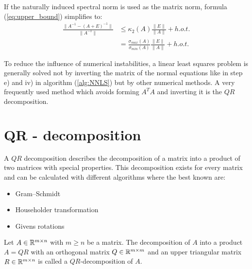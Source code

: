 \begin{remark}
	If the naturally induced spectral norm is used as the matrix norm, formula (\ref{eq:upper_bound}) simplifies to:
	\begin{align*}
		\frac{\lVert A^{-1} - (A + E)^{-1} \rVert}{\lVert A^{-1}\rVert} & \leq \kappa_2(A) \frac{\lVert E \rVert}{\lVert A \rVert} + h.o.t. \\
		& = \frac{\sigma_{max}(A)}{\sigma_{min}(A)} \frac{\lVert E \rVert}{\lVert A \rVert} + h.o.t.
	\end{align*}
\end{remark}


To reduce the influence of numerical instabilities, a linear least squares problem is generally solved not by inverting the matrix of the normal equations like in step e) and iv) in algorithm (\ref{alg:NNLS}) but by other numerical methods. A very frequently used method which avoids forming $A^TA$ and inverting it is the $QR$ decomposition.  

\section{QR - decomposition}

A $QR$ decomposition describes the decomposition of a matrix into a product of two matrices with special properties. This decomposition exists for every matrix and can be calculated with different algorithms where the best known are:

\begin{itemize}
	\item Gram–Schmidt
	\item Householder transformation
	\item Givens rotations
\end{itemize}

\begin{definition}
	Let $A \in \mathbb{R}^{m \times n}$ with $m \geq n$ be a matrix. The decomposition of $A$ into a product $A = QR$ with an orthogonal matrix $Q \in \mathbb{R}^{m \times m}$ and an upper triangular matrix $R \in \mathbb{R}^{m \times n}$ is called a $QR$-decomposition of $A$. 
\end{definition}

